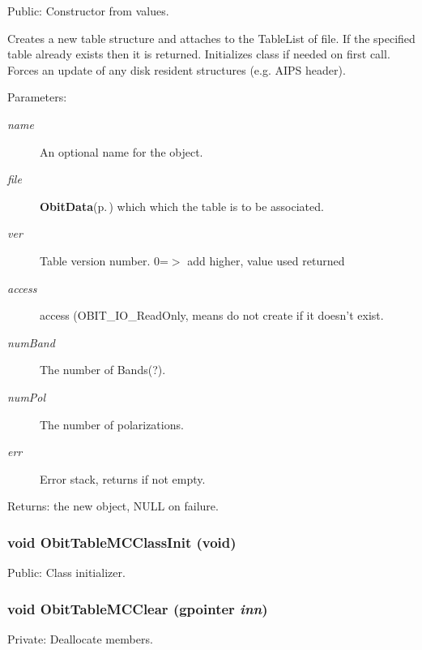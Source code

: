 Public: Constructor from values. 

Creates a new table structure and attaches to the Table\-List of file. If the specified table already exists then it is returned. Initializes class if needed on first call. Forces an update of any disk resident structures (e.g. AIPS header). \begin{Desc}
\item[Parameters:]
\begin{description}
\item[{\em name}]An optional name for the object. \item[{\em file}]{\bf Obit\-Data}{\rm (p.\,\pageref{structObitData})} which which the table is to be associated. \item[{\em ver}]Table version number. 0=$>$ add higher, value used returned \item[{\em access}]access (OBIT\_\-IO\_\-Read\-Only, means do not create if it doesn't exist. \item[{\em num\-Band}]The number of Bands(?). \item[{\em num\-Pol}]The number of polarizations. \item[{\em err}]Error stack, returns if not empty. \end{description}
\end{Desc}
\begin{Desc}
\item[Returns:]the new object, NULL on failure. \end{Desc}
\subsubsection{\setlength{\rightskip}{0pt plus 5cm}void Obit\-Table\-MCClass\-Init (void)}\label{ObitTableMC_8c_a27}


Public: Class initializer. 

\subsubsection{\setlength{\rightskip}{0pt plus 5cm}void Obit\-Table\-MCClear (gpointer {\em inn})}\label{ObitTableMC_8c_a9}


Private: Deallocate members. 

